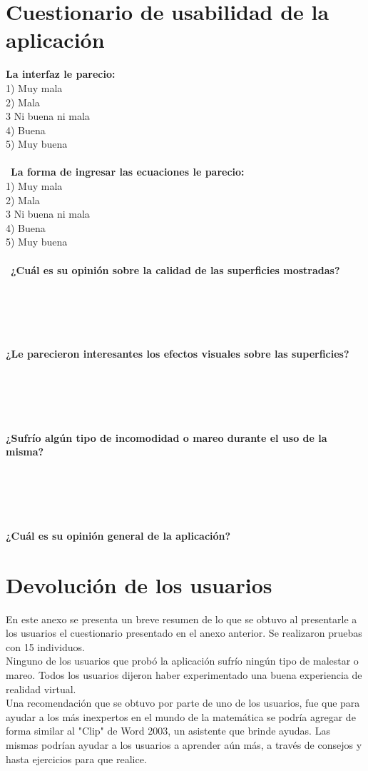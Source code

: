\documentclass[12pt]{article}
\begin{document}
\section{Cuestionario de usabilidad de la aplicación}
\textbf{La interfaz le parecio:}
\\ 1) Muy mala
\\ 2) Mala
\\ 3 Ni buena ni mala
\\ 4) Buena
\\ 5) Muy buena
\\\\\
\textbf{La forma de ingresar las ecuaciones le parecio:}
\\ 1) Muy mala
\\ 2) Mala
\\ 3 Ni buena ni mala
\\ 4) Buena
\\ 5) Muy buena
\\\\\
\textbf{¿Cuál es su opinión sobre la calidad de las superficies mostradas?}
\\\\\\\\\\\\
\textbf{¿Le parecieron interesantes los efectos visuales sobre las superficies?}
\\\\\\\\\\\\
\textbf{¿Sufrío algún tipo de incomodidad o mareo durante el uso de la misma?}
\\\\\\\\\\\\
\textbf{¿Cuál es su opinión general de la aplicación?}
\clearpage
\section{Devolución de los usuarios}
En este anexo se presenta un breve resumen de lo que se obtuvo al presentarle a los usuarios el cuestionario presentado en el anexo anterior. Se realizaron pruebas con 15 individuos.
\\Ninguno de los usuarios que probó la aplicación sufrío ningún tipo de malestar o mareo. Todos los usuarios dijeron haber experimentado una buena experiencia de realidad virtual.
\\Una recomendación que se obtuvo por parte de uno de los usuarios, fue que para ayudar a los más inexpertos en el mundo de la matemática se podría agregar de forma similar al "Clip" de Word 2003, un asistente que brinde ayudas. Las mismas podrían ayudar a los usuarios a aprender aún más, a través de consejos y hasta ejercicios para que realice.
\clearpage
\end{document}
